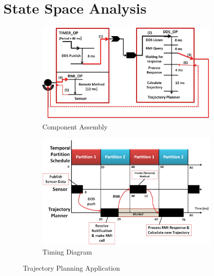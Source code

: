 \vspace{-0.2in}

\section{State Space Analysis}
\label{sec:State_Space_Analysis}


\begin{figure}[t]
	\centering
	\begin{subfigure}[b]{0.5\textwidth}
		\includegraphics[width=\textwidth]{./figs/tpa}
		\caption{Component Assembly}
		\label{fig:tpa}
	\end{subfigure}%
	\begin{subfigure}[b]{0.5\textwidth}
		\includegraphics[width=\textwidth]{./figs/tpa_td}
		\caption{Timing Diagram}
		\label{fig:tpa_td}
	\end{subfigure}
	\caption{Trajectory Planning Application}\label{fig:TPA}
\end{figure}




